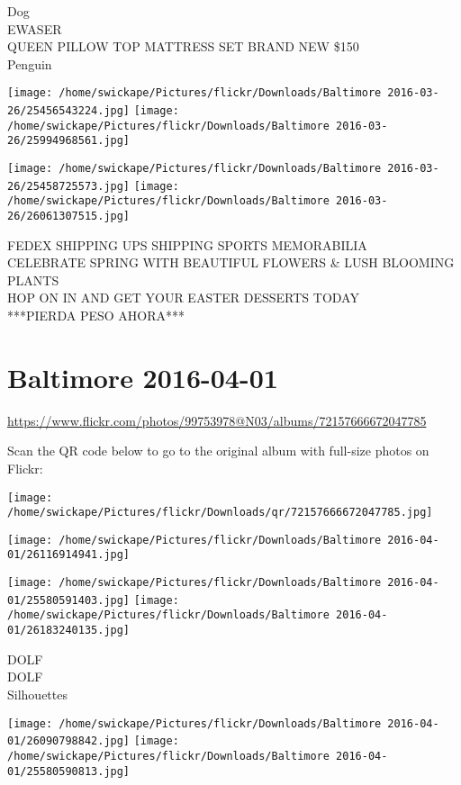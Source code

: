 \documentclass[10pt,letterpaper]{article}
\begin{document}
Dog\\
EWASER\\
QUEEN PILLOW TOP MATTRESS SET BRAND NEW \$150\\
Penguin
\pagebreak

\texttt{[image: /home/swickape/Pictures/flickr/Downloads/Baltimore 2016-03-26/25456543224.jpg]}
\texttt{[image: /home/swickape/Pictures/flickr/Downloads/Baltimore 2016-03-26/25994968561.jpg]}

\texttt{[image: /home/swickape/Pictures/flickr/Downloads/Baltimore 2016-03-26/25458725573.jpg]}
\texttt{[image: /home/swickape/Pictures/flickr/Downloads/Baltimore 2016-03-26/26061307515.jpg]}

FEDEX SHIPPING UPS SHIPPING SPORTS MEMORABILIA\\
CELEBRATE SPRING WITH BEAUTIFUL FLOWERS \& LUSH BLOOMING PLANTS\\
HOP ON IN AND GET YOUR EASTER DESSERTS TODAY\\
***PIERDA PESO AHORA***
\pagebreak

\section*{Baltimore 2016-04-01}

\url{https://www.flickr.com/photos/99753978@N03/albums/72157666672047785}

Scan the QR code below to go to the original album with full-size photos on Flickr:

\texttt{[image: /home/swickape/Pictures/flickr/Downloads/qr/72157666672047785.jpg]}
\pagebreak

\texttt{[image: /home/swickape/Pictures/flickr/Downloads/Baltimore 2016-04-01/26116914941.jpg]}

\vspace{0.25in}
\texttt{[image: /home/swickape/Pictures/flickr/Downloads/Baltimore 2016-04-01/25580591403.jpg]}
\texttt{[image: /home/swickape/Pictures/flickr/Downloads/Baltimore 2016-04-01/26183240135.jpg]}

DOLF\\
DOLF\\
Silhouettes
\pagebreak

\texttt{[image: /home/swickape/Pictures/flickr/Downloads/Baltimore 2016-04-01/26090798842.jpg]}
\texttt{[image: /home/swickape/Pictures/flickr/Downloads/Baltimore 2016-04-01/25580590813.jpg]}
\end{document}

